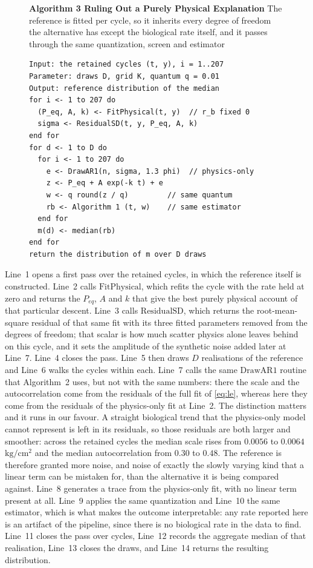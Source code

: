 \documentclass[runningheads]{llncs}
\newcommand{\pu}{\ensuremath{\mathrm{kg/cm^{2}}}}
\begin{document}
\begin{figure}[t]
\noindent\textbf{Algorithm 3  Ruling Out a Purely Physical Explanation}
The reference is fitted per cycle, so it inherits every degree of
freedom the alternative has except the biological rate itself, and it
passes through the same quantization, screen and estimator

\begin{verbatim}
Input: the retained cycles (t, y), i = 1..207
Parameter: draws D, grid K, quantum q = 0.01
Output: reference distribution of the median
for i <- 1 to 207 do
  (P_eq, A, k) <- FitPhysical(t, y)  // r_b fixed 0
  sigma <- ResidualSD(t, y, P_eq, A, k)
end for
for d <- 1 to D do
  for i <- 1 to 207 do
    e <- DrawAR1(n, sigma, 1.3 phi)  // physics-only
    z <- P_eq + A exp(-k t) + e
    w <- q round(z / q)         // same quantum
    rb <- Algorithm 1 (t, w)    // same estimator
  end for
  m(d) <- median(rb)
end for
return the distribution of m over D draws
\end{verbatim}

\end{figure}

Line~1 opens a first pass over the retained cycles, in which the
reference itself is constructed. Line~2 calls $\mathrm{FitPhysical}$,
which refits the cycle with the rate held at zero and returns the
$P_{eq}$, $A$ and $k$ that give the best purely physical account of
that particular descent. Line~3 calls $\mathrm{ResidualSD}$, which
returns the root-mean-square residual of that same fit with its three
fitted parameters removed from the degrees of freedom; that scalar is
how much scatter physics alone leaves behind on this cycle, and it
sets the amplitude of the synthetic noise added later at Line~7.
Line~4 closes the pass. Line~5 then
draws $D$ realisations of the reference and Line~6 walks the cycles
within each. Line~7 calls the same $\mathrm{DrawAR1}$ routine that
Algorithm~2 uses, but not with the same numbers: there the scale and
the autocorrelation come from the residuals of the full fit of
\eqref{eq:le}, whereas here they come from the residuals of the
physics-only fit at Line~2. The distinction matters and it runs in our
favour. A straight biological trend that the physics-only model cannot
represent is left in its residuals, so those residuals are both larger
and smoother: across the retained cycles the median scale rises from
$0.0056$ to $0.0064$~\pu{} and the median autocorrelation from $0.30$
to $0.48$. The reference is therefore granted more noise, and noise of
exactly the slowly varying kind that a linear term can be mistaken
for, than the alternative it is being compared against. Line~8
generates a trace from the physics-only fit, with no linear term
present at all. Line~9 applies the same quantization and
Line~10 the same estimator, which is what makes the outcome
interpretable: any rate reported here is an artifact of the pipeline,
since there is no biological rate in the data to find. Line~11 closes
the pass over cycles, Line~12 records the aggregate median of that
realisation, Line~13 closes the draws, and Line~14 returns the
resulting distribution.
\end{document}

